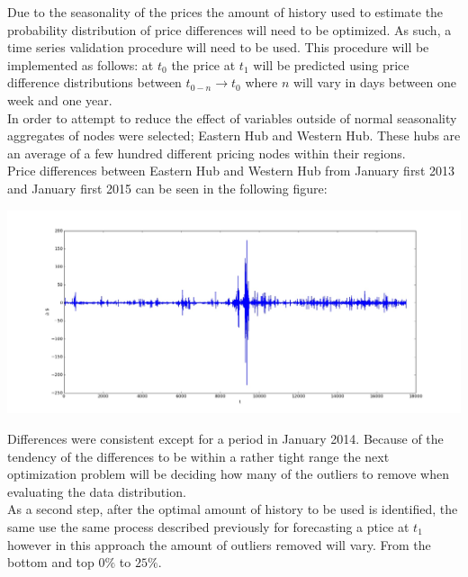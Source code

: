 \documentclass{report}
\begin{document}
Due to the seasonality of the prices the amount of history used to estimate the
probability distribution of price differences will need to be optimized. As such,
a time series validation procedure will need to be used. This procedure will be
implemented as follows: at $t_0$ the price at $t_1$ will be predicted using price
difference distributions between $t_{0-n} \rightarrow t_0$ where $n$ will vary in days
between one week and one year.\\

In order to attempt to reduce the effect of variables outside of normal seasonality
aggregates of nodes were selected; Eastern Hub and Western Hub. These hubs are an average
of a few hundred different pricing nodes within their regions.\\

Price differences between Eastern Hub and Western Hub from
January first 2013 and January first 2015 can be seen in the following figure:

\begin{center}
\includegraphics[width=500pt, keepaspectratio=true]{price_differences.jpg}
\end{center}

Differences were consistent except for a period in January 2014. Because of the
tendency of the differences to be within a rather tight range the next optimization
problem will be deciding how many of the outliers to remove when evaluating the
data distribution.\\

As a second step, after the optimal amount of history to be used is identified, the
same use the same process described previously for forecasting a ptice at $t_1$
however in this approach the amount of outliers removed will vary. From the bottom
and top $0\%$ to $25\%$.\\
\end{document}
